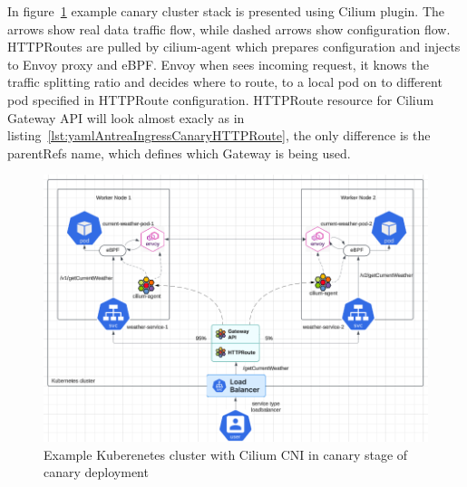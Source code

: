 In figure~\ref{fig:ciliumDataflow} example canary cluster stack is presented using Cilium plugin. The arrows show real data traffic flow, while dashed arrows show configuration flow. HTTPRoutes are pulled by cilium-agent which prepares configuration and injects to Envoy proxy and eBPF. Envoy when sees incoming request, it knows the traffic splitting ratio and decides where to route, to a local pod on to different pod specified in HTTPRoute configuration. HTTPRoute resource for Cilium Gateway API will look almost exacly as in listing~\ref{lst:yamlAntreaIngressCanaryHTTPRoute}, the only difference is the parentRefs name, which defines which Gateway is being used.

\begin{figure}[H]
    \centering
    \includegraphics[width=1\columnwidth]{images/cilium_dataflow.png}
    \caption{Example Kuberenetes cluster with Cilium CNI in canary stage of canary deployment}
    \label{fig:ciliumDataflow}
\end{figure}

